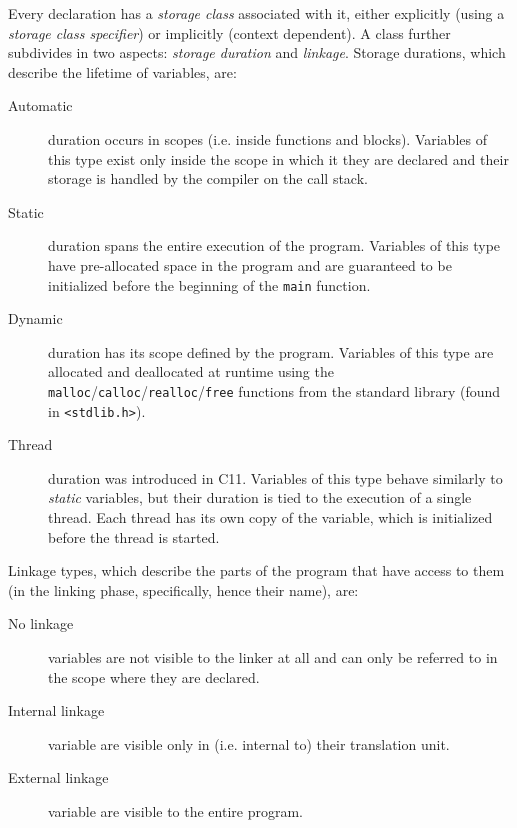 \label{subsec:c:storage}

Every declaration has a \textit{storage class} associated with it, either
explicitly (using a \textit{storage class specifier}) or implicitly (context
dependent).  A class further subdivides in two aspects: \textit{storage
duration} and \textit{linkage}.  Storage durations, which describe the lifetime
of variables, are:

\begin{description}
    \item[Automatic]
        duration occurs in scopes (i.e. inside functions and blocks).  Variables
        of this type exist only inside the scope in which it they are declared
        and their storage is handled by the compiler on the call stack.
    \item[Static]
        duration spans the entire execution of the program.  Variables of this
        type have pre-allocated space in the program and are guaranteed to be
        initialized before the beginning of the \texttt{main} function.
    \item[Dynamic]
        duration has its scope defined by the program.  Variables of this type
        are allocated and deallocated at runtime using the
        \texttt{malloc}/\texttt{calloc}/\texttt{realloc}/\texttt{free} functions
        from the standard library (found in \texttt{<stdlib.h>}).
    \item[Thread]
        duration was introduced in C11.  Variables of this type behave similarly
        to \emph{static} variables, but their duration is tied to the execution
        of a single thread.  Each thread has its own copy of the variable, which
        is initialized before the thread is started.
\end{description}

Linkage types, which describe the parts of the program that have access to them
(in the linking phase, specifically, hence their name), are:

\begin{description}
    \item[No linkage]
        variables are not visible to the linker at all and can only be referred
        to in the scope where they are declared.
    \item[Internal linkage]
        variable are visible only in (i.e. internal to) their translation unit.
    \item[External linkage] variable are visible to the entire program.
\end{description}


